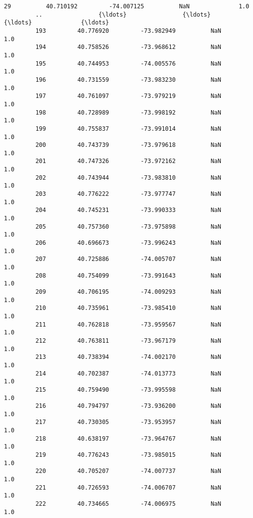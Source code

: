 \documentclass[11pt]{article}
\begin{document}
\begin{Verbatim}[commandchars=\\\{\}]
         29          40.710192         -74.007125          NaN              1.0   
         ..                {\ldots}                {\ldots}          {\ldots}              {\ldots}   
         193         40.776920         -73.982949          NaN              1.0   
         194         40.758526         -73.968612          NaN              1.0   
         195         40.744953         -74.005576          NaN              1.0   
         196         40.731559         -73.983230          NaN              1.0   
         197         40.761097         -73.979219          NaN              1.0   
         198         40.728989         -73.998192          NaN              1.0   
         199         40.755837         -73.991014          NaN              1.0   
         200         40.743739         -73.979618          NaN              1.0   
         201         40.747326         -73.972162          NaN              1.0   
         202         40.743944         -73.983810          NaN              1.0   
         203         40.776222         -73.977747          NaN              1.0   
         204         40.745231         -73.990333          NaN              1.0   
         205         40.757360         -73.975898          NaN              1.0   
         206         40.696673         -73.996243          NaN              1.0   
         207         40.725886         -74.005707          NaN              1.0   
         208         40.754099         -73.991643          NaN              1.0   
         209         40.706195         -74.009293          NaN              1.0   
         210         40.735961         -73.985410          NaN              1.0   
         211         40.762818         -73.959567          NaN              1.0   
         212         40.763811         -73.967179          NaN              1.0   
         213         40.738394         -74.002170          NaN              1.0   
         214         40.702387         -74.013773          NaN              1.0   
         215         40.759490         -73.995598          NaN              1.0   
         216         40.794797         -73.936200          NaN              1.0   
         217         40.730305         -73.953957          NaN              1.0   
         218         40.638197         -73.964767          NaN              1.0   
         219         40.776243         -73.985015          NaN              1.0   
         220         40.705207         -74.007737          NaN              1.0   
         221         40.726593         -74.006707          NaN              1.0   
         222         40.734665         -74.006975          NaN              1.0   
         

\end{Verbatim}
\end{document}
